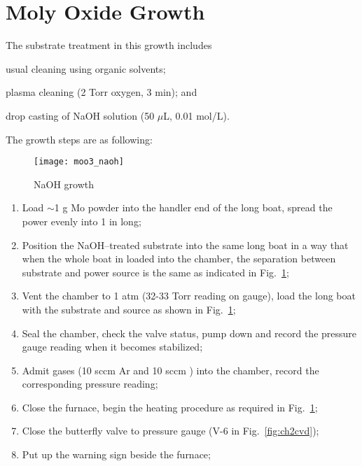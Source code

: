 \section{Moly Oxide Growth}


The substrate treatment in this growth includes \begin{enumerate*}[label=\itshape\alph*\upshape)]
\item usual cleaning using organic solvents;
\item plasma cleaning (2 Torr oxygen, 3 min); and
\item drop casting of NaOH solution (50 $\mu$L, 0.01 mol/L).
\end{enumerate*} The growth steps are as following: 

\begin{figure}[htb]
\centering
\texttt{[image: moo3\_naoh]}
\caption{NaOH  growth}
\label{fig:namo}
\end{figure}

\begin{enumerate}
\item Load $\sim$1 g Mo powder into the handler end of the long boat, spread the power evenly into 1 in long;
\item Position the NaOH--treated substrate into the same long boat in a way that when the whole boat in loaded into the chamber, the separation between substrate and power source is the same as indicated in Fig.~\ref{fig:namo};
\item Vent the chamber to 1 atm (32-33 Torr reading on gauge), load the long boat with the substrate and source as shown in Fig.~\ref{fig:namo};
\item Seal the chamber, check the valve status, pump down and record the pressure gauge reading when it becomes stabilized; 
\item Admit gases (10 sccm Ar and 10 sccm ) into the chamber, record the corresponding pressure reading;
\item Close the furnace, begin the heating procedure as required in Fig.~\ref{fig:namo}; 
\item Close the butterfly valve to pressure gauge (V-6 in Fig.~\ref{fig:ch2cvd});
\item Put up the warning sign beside the furnace;
\end{enumerate}








\iffalse

